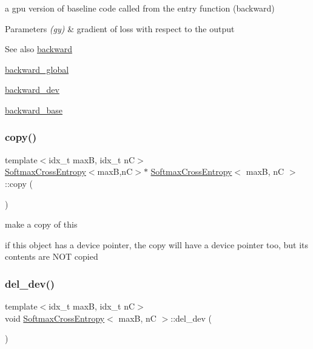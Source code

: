a gpu version of baseline code called from the entry function (backward) 


\begin{DoxyParams}{Parameters}
{\em (gy)} & gradient of loss with respect to the output \\
\hline
\end{DoxyParams}
\begin{DoxySeeAlso}{See also}
\hyperlink{structSoftmaxCrossEntropy_afb506c6159bd6cd02a6c5e8426628fe0}{backward} 

\hyperlink{softmaxcrossentropy_8h_a47d56a9a23e08247b227f4aac17413e0}{backward\+\_\+global} 

\hyperlink{structSoftmaxCrossEntropy_ad7560f49148405e09d5a9a0a6ee0ee92}{backward\+\_\+dev} 

\hyperlink{structSoftmaxCrossEntropy_a1cea37bcbeedb5749f56f740baa6ce92}{backward\+\_\+base} 
\end{DoxySeeAlso}
\mbox{\label{structSoftmaxCrossEntropy_aa152e1e400520acefcaa8bfa0999fce7}} 
\subsubsection{\texorpdfstring{copy()}{copy()}}
{\footnotesize\ttfamily template$<$idx\+\_\+t maxB, idx\+\_\+t nC$>$ \\
\hyperlink{structSoftmaxCrossEntropy}{Softmax\+Cross\+Entropy}$<$maxB,nC$>$$\ast$ \hyperlink{structSoftmaxCrossEntropy}{Softmax\+Cross\+Entropy}$<$ maxB, nC $>$\+::copy (\begin{DoxyParamCaption}{ }\end{DoxyParamCaption})\hspace{0.3cm}{\ttfamily [inline]}}



make a copy of this 

if this object has a device pointer, the copy will have a device pointer too, but its contents are N\+OT copied \mbox{\label{structSoftmaxCrossEntropy_acbef8ab0f759568a85decdcfd4a5353c}} 
\subsubsection{\texorpdfstring{del\+\_\+dev()}{del\_dev()}}
{\footnotesize\ttfamily template$<$idx\+\_\+t maxB, idx\+\_\+t nC$>$ \\
void \hyperlink{structSoftmaxCrossEntropy}{Softmax\+Cross\+Entropy}$<$ maxB, nC $>$\+::del\+\_\+dev (\begin{DoxyParamCaption}{ }\end{DoxyParamCaption})\hspace{0.3cm}{\ttfamily [inline]}}



